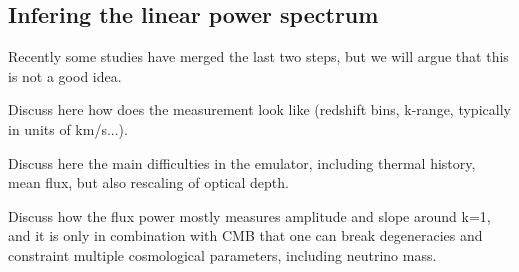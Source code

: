 \subsection{Infering the linear power spectrum}

Recently some studies have merged the last two steps, but we will argue that
this is not a good idea. 

Discuss here how does the measurement look like (redshift bins, k-range, 
typically in units of km/s...).

Discuss here the main difficulties in the emulator, including thermal history, 
mean flux, but also rescaling of optical depth. 

Discuss how the flux power mostly measures amplitude and slope around k=1, and 
it is only in combination with CMB that one can break degeneracies and 
constraint multiple cosmological parameters, including neutrino mass. 

